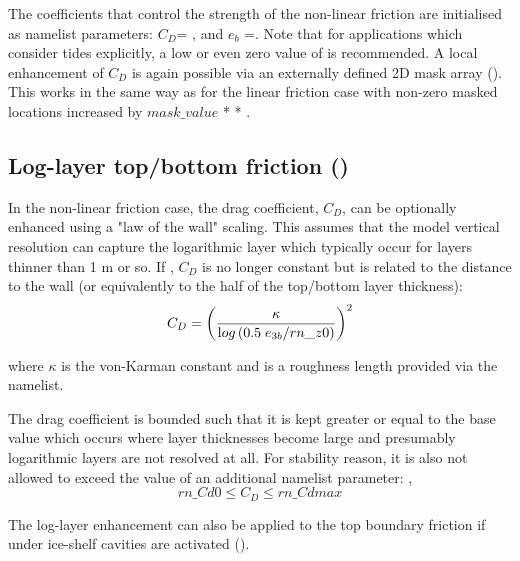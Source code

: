 \documentclass[../main/NEMO_manual]{subfiles}
\begin{document}
The coefficients that control the strength of the non-linear friction are initialised as namelist parameters:
$C_D$= , and $e_b$ =.
Note that for applications which consider tides explicitly, a low or even zero value of  is recommended. A local enhancement of $C_D$ is again possible via an externally defined 2D mask array
().
This works in the same way as for the linear friction case with non-zero masked locations increased by
$mask\_value$ *  * .

\subsection[Log-layer top/bottom friction (\forcode{ln_loglayer})]{Log-layer top/bottom friction (\protect{})}
\label{subsec:ZDF_drg_loglayer}

In the non-linear friction case, the drag coefficient, $C_D$, can be optionally enhanced using
a "law of the wall" scaling. This assumes that the model vertical resolution can capture the logarithmic layer which typically occur for layers thinner than 1 m or so.
If  , $C_D$ is no longer constant but is related to the distance to the wall (or equivalently to the half of the top/bottom layer thickness):
\[
  C_D = \left ( {\kappa \over {\mathrm log}\left ( 0.5 \; e_{3b} / rn\_{z0} \right ) } \right )^2
\]

\noindent where $\kappa$ is the von-Karman constant and  is a roughness length provided via the namelist.

The drag coefficient is bounded such that it is kept greater or equal to
the base  value which occurs where layer thicknesses become large and presumably logarithmic layers are not resolved at all. For stability reason, it is also not allowed to exceed the value of an additional namelist parameter:
, \ie
\[
  rn\_Cd0 \leq C_D \leq rn\_Cdmax
\]

\noindent The log-layer enhancement can also be applied to the top boundary friction if
under ice-shelf cavities are activated ().
\end{document}
